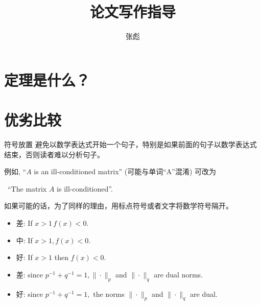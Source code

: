 \documentclass{ctexbeamer}
\begin{document}
\title[]{论文写作指导}
\author[]{{\large 张彪} }

\date{}






\begin{frame}
\maketitle
\end{frame}


\section{定理是什么？}


\section{优劣比较}

\begin{frame}{符号放置}
	避免以数学表达式开始一个句子，特别是如果前面的句子以数学表达式结束，否则读者难以分析句子。
	
	例如, ``$A$ is  an ill-conditioned matrix'' 
	(可能与单词``A''混淆)	
	可改为\pause
	
	 \qquad 	 \ ``The matrix $A$ is   ill-conditioned''. 
\vspace{10pt}

如果可能的话，为了同样的理由，用标点符号或者文字将数学符号隔开。

	\begin{itemize}
\item 差: If $x>1 \, f(x)<0$.\pause

\item 中: If $x>1, f(x)<0$. \pause

\item  好: If $x>1$ then $f(x)<0$.
	\end{itemize}

\vspace{10pt}

	\begin{itemize}
	\item 
差: since $p^{-1}+q^{-1}=1,\|\cdot\|_{p}$ and $\|\cdot\|_{q}$ are dual norms. \pause

\item  好: since $p^{-1}+q^{-1}=1,$ the norms $\|\cdot\|_{p}$ and $\|\cdot\|_{q}$ are dual.
	\end{itemize}
\vspace{10pt}
\end{frame}
\end{document}
